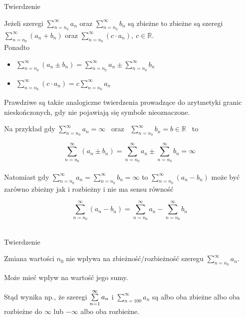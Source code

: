 \begin{tw}{Twierdzenie}

Jeżeli szeregi $ \sum\limits_{n = n_0}^{\infty} a_n $ oraz $ \sum\limits_{n = n_0}^{\infty} b_n $ są zbieżne to zbieżne są szeregi
$ \sum\limits_{n = n_0}^{\infty} (a_n + b_n) $ \linebreak oraz $ \sum\limits_{n = n_0}^{\infty} (c \cdot a_n), \ c \in \mathbb{R} $. \\

Ponadto

\begin{itemize}
    \item $ \sum\limits_{n = n_0}^{\infty} (a_n \pm b_n) = \sum\limits_{n = n_0}^{\infty} a_n \pm \sum\limits_{n = n_0}^{\infty} b_n $
    \item $ \sum\limits_{n = n_0}^{\infty} (c \cdot a_n) = c \sum\limits_{n = n_0}^{\infty} a_n $ \\
\end{itemize}

Prawdziwe są także analogiczne twierdzenia prowadzące do arytmetyki granic nieskończonych, gdy nie pojawiają się symbole nieoznaczone.
\end{tw}

Na przykład gdy $ \sum\limits_{n = n_0}^{\infty} a_n = \infty $ \ oraz \ $ \sum\limits_{n = n_0}^{\infty} b_n = b \in \mathbb{R} $ \ to 

$$ \sum\limits_{n = n_0}^{\infty} (a_n \pm b_n) = \sum\limits_{n = n_0}^{\infty} a_n \pm \sum\limits_{n = n_0}^{\infty} b_n = \infty $$ \\

Natomiast gdy $ \sum\limits_{n = n_0}^{\infty} a_n = \sum\limits_{n = n_0}^{\infty} b_n = \infty $ to
$ \sum\limits_{n = n_0}^{\infty} (a_n - b_n) $ może być zarówno zbieżny jak i rozbieżny i nie ma sensu równość

$$ \sum\limits_{n = n_0}^{\infty} (a_n - b_n) = \sum\limits_{n = n_0}^{\infty} a_n - \sum\limits_{n = n_0}^{\infty} b_n $$ \\

\begin{tw}{Twierdzenie}

Zmiana wartości $n_0$ nie wpływa na zbieżność/rozbieżność szeregu $ \sum\limits_{n = n_0}^{\infty} a_n $.

Może mieć wpływ na wartość jego sumy.
\end{tw}

Stąd wynika np., że szeregi $ \sum\limits_{n = 1}^{\infty} a_n $ i $ \sum\limits_{n = 100}^{\infty} a_n $ są albo oba zbieżne
albo oba rozbieżne do $ \infty $ lub $-\infty$ albo oba rozbieżne.


